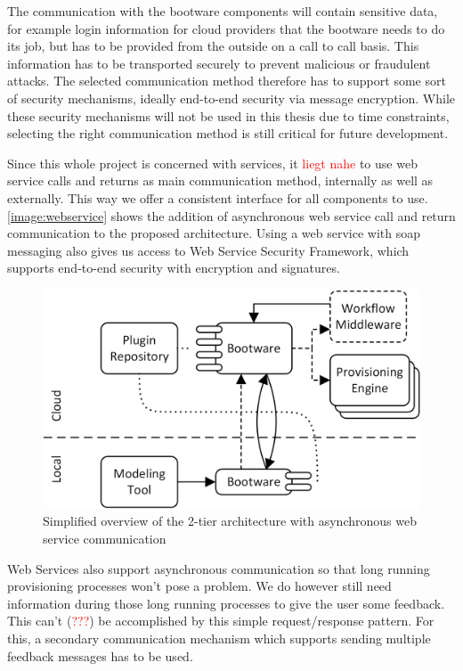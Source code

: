 The communication with the bootware components will contain sensitive data, for example login information for cloud providers that the bootware needs to do its job, but has to be provided from the outside on a call to call basis.
This information has to be transported securely to prevent malicious or fraudulent attacks.
The selected communication method therefore has to support some sort of security mechanisms, ideally end-to-end security via message encryption.
While these security mechanisms will not be used in this thesis due to time constraints, selecting the right communication method is still critical for future development.

Since this whole project is concerned with services, it \textcolor{red}{liegt nahe} to use web service calls and returns as main communication method, internally as well as  externally.
This way we offer a consistent interface for all components to use.
\autoref{image:webservice} shows the addition of asynchronous web service call and return communication to the proposed architecture.
Using a web service with soap messaging also gives us access to Web Service Security Framework, which supports end-to-end security with encryption and signatures.

\begin{figure}[!htbp]
	\centering
	\includegraphics[resolution=600]{design/assets/simple_webservice}
	\caption{Simplified overview of the 2-tier architecture with asynchronous web service communication}
	\label{image:webservice}
\end{figure}

Web Services also support asynchronous communication so that long running provisioning processes won't pose a problem.
We do however still need information during those long running processes to give the user some feedback.
This can't (\textcolor{red}{???}) be accomplished by this simple request/response pattern.
For this, a secondary communication mechanism which supports sending multiple feedback messages has to be used.

